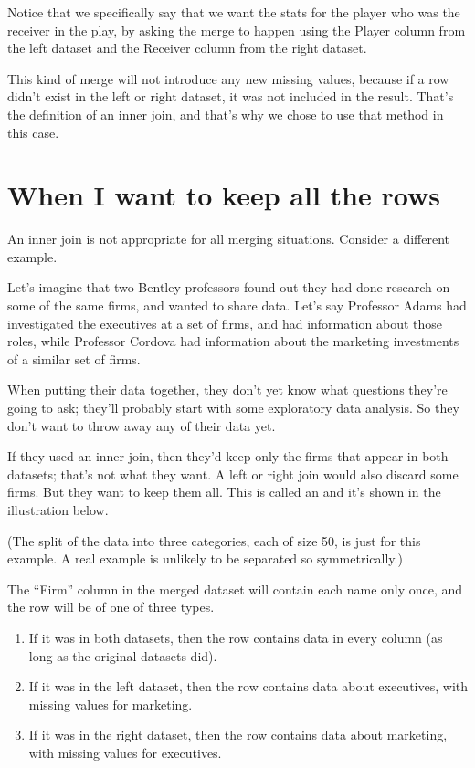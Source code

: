 \documentclass[letterpaper,10pt,english]{jupyterBook}
\begin{document}
\sphinxAtStartPar
Notice that we specifically say that we want the stats for the player who was the receiver in the play, by asking the merge to happen using the Player column from the left dataset and the Receiver column from the right dataset.

\sphinxAtStartPar
This kind of merge will not introduce any new missing values, because if a row didn’t exist in the left or right dataset, it was not included in the result.  That’s the definition of an inner join, and that’s why we chose to use that method in this case.


\section{When I want to keep all the rows}
\label{\detokenize{chapter-12-concat-and-merge:when-i-want-to-keep-all-the-rows}}
\sphinxAtStartPar
An inner join is not appropriate for all merging situations.  Consider a different example.

\sphinxAtStartPar
Let’s imagine that two Bentley professors found out they had done research on some of the same firms, and wanted to share data.  Let’s say Professor Adams had investigated the executives at a set of firms, and had information about those roles, while Professor Cordova had information about the marketing investments of a similar set of firms.

\sphinxAtStartPar
When putting their data together, they don’t yet know what questions they’re going to ask; they’ll probably start with some exploratory data analysis.  So they don’t want to throw away any of their data yet.

\sphinxAtStartPar
If they used an inner join, then they’d keep only the firms that appear in both datasets; that’s not what they want.  A left or right join would also discard some firms.  But they want to keep them all.  This is called an  and it’s shown in the illustration below.

\sphinxAtStartPar
(The split of the data into three categories, each of size 50, is just for this example.  A real example is unlikely to be separated so symmetrically.)

\sphinxAtStartPar
{}

\sphinxAtStartPar
The “Firm” column in the merged dataset will contain each name only once, and the row will be of one of three types.
\begin{enumerate}
%
\item {} 
\sphinxAtStartPar
If it was in both datasets, then the row contains data in every column (as long as the original datasets did).

\item {} 
\sphinxAtStartPar
If it was in the left dataset, then the row contains data about executives, with missing values for marketing.

\item {} 
\sphinxAtStartPar
If it was in the right dataset, then the row contains data about marketing, with missing values for executives.

\end{enumerate}
\end{document}
